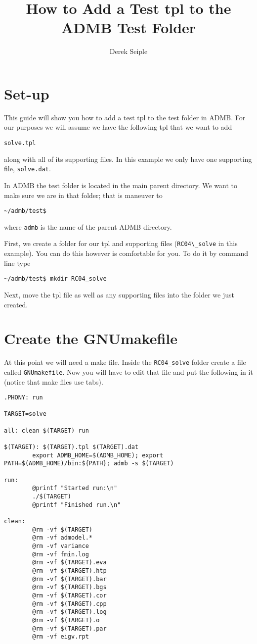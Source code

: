 \documentclass{article}
\begin{document}
\author{Derek Seiple}
\title{How to Add a Test tpl to the ADMB Test Folder}
\date{}
\maketitle

\section{Set-up}
This guide will show you how to add a test tpl to the test folder in ADMB.
For our purposes we will assume we have the following tpl that we want to add
\begin{verbatim}
solve.tpl
\end{verbatim}
along with all of its supporting files. In this example we only have one
supporting file, \verb"solve.dat".

In ADMB the test folder is located in the main parent directory. We want to
make sure we are in that folder; that is maneuver to
\begin{verbatim}
~/admb/test$
\end{verbatim}
where \verb"admb" is the name of the parent ADMB directory.

First, we create a folder for our tpl and supporting files (\verb"RC04\_solve" in this
example). You can do this however is comfortable for you. To do it by command line type
\begin{verbatim}
~/admb/test$ mkdir RC04_solve
\end{verbatim}
Next, move the tpl file as well as any supporting files into the folder we just
created.

\section{Create the GNUmakefile}

At this point we will need a make file. Inside the \verb"RC04_solve" folder
create a file called \verb"GNUmakefile". Now you will have to edit that file and put
the following in it (notice that make files use tabs).

\begin{verbatim}
.PHONY: run

TARGET=solve

all: clean $(TARGET) run

$(TARGET): $(TARGET).tpl $(TARGET).dat
        export ADMB_HOME=$(ADMB_HOME); export PATH=$(ADMB_HOME)/bin:${PATH}; admb -s $(TARGET)

run:
        @printf "Started run:\n"
        ./$(TARGET)
        @printf "Finished run.\n"

clean:
        @rm -vf $(TARGET)
        @rm -vf admodel.*
        @rm -vf variance
        @rm -vf fmin.log
        @rm -vf $(TARGET).eva
        @rm -vf $(TARGET).htp
        @rm -vf $(TARGET).bar
        @rm -vf $(TARGET).bgs
        @rm -vf $(TARGET).cor
        @rm -vf $(TARGET).cpp
        @rm -vf $(TARGET).log
        @rm -vf $(TARGET).o
        @rm -vf $(TARGET).par
        @rm -vf eigv.rpt
\end{verbatim}
\end{document}

